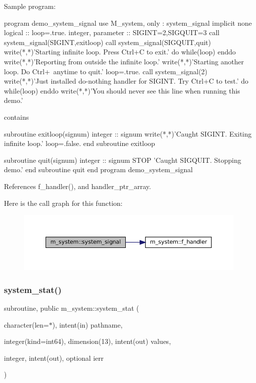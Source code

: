 \begin{DoxyVerb}Sample program:

 program demo_system_signal
 use M_system, only : system_signal
 implicit none
 logical :: loop=.true.
 integer, parameter :: SIGINT=2,SIGQUIT=3
 call system_signal(SIGINT,exitloop)
 call system_signal(SIGQUIT,quit)
 write(*,*)'Starting infinite loop. Press Ctrl+C to exit.'
 do while(loop)
 enddo
 write(*,*)'Reporting from outside the infinite loop.'
 write(*,*)'Starting another loop. Do Ctrl+\ anytime to quit.'
 loop=.true.
 call system_signal(2)
 write(*,*)'Just installed do-nothing handler for SIGINT. Try Ctrl+C to test.'
 do while(loop)
 enddo
 write(*,*)'You should never see this line when running this demo.'

 contains

 subroutine exitloop(signum)
   integer :: signum
   write(*,*)'Caught SIGINT. Exiting infinite loop.'
   loop=.false.
 end subroutine exitloop

 subroutine quit(signum)
   integer :: signum
   STOP 'Caught SIGQUIT. Stopping demo.'
 end subroutine quit
 end program demo_system_signal \end{DoxyVerb}
 

References f\+\_\+handler(), and handler\+\_\+ptr\+\_\+array.

Here is the call graph for this function\+:\nopagebreak
\begin{figure}[H]
\begin{center}
\leavevmode
\includegraphics[width=350pt]{namespacem__system_a4a70cade424b9763dedd8cb8c0059e8c_cgraph}
\end{center}
\end{figure}
\mbox{\label{namespacem__system_a5bb1ebcebe181e07fd24e908cacc9887}} 
\subsubsection{\texorpdfstring{system\+\_\+stat()}{system\_stat()}}
{\footnotesize\ttfamily subroutine, public m\+\_\+system\+::system\+\_\+stat (\begin{DoxyParamCaption}\item[{character(len=$\ast$), intent(in)}]{pathname,  }\item[{integer(kind=int64), dimension(13), intent(out)}]{values,  }\item[{integer, intent(out), optional}]{ierr }\end{DoxyParamCaption})}



